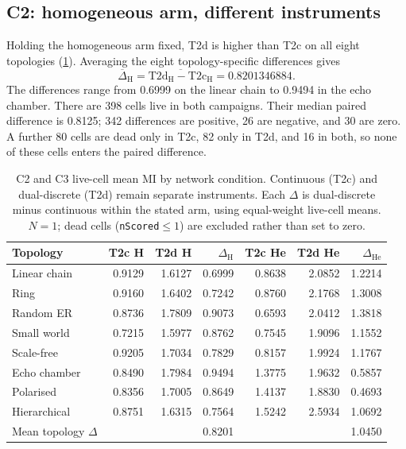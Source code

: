 \subsection{C2: homogeneous arm, different instruments}
\label{subsec:c2-mpr}

Holding the homogeneous arm fixed, T2d is higher than T2c on all eight
topologies (\cref{tab:c2c3-mpr}).  Averaging the eight topology-specific
differences gives
\[
  \overline{\Delta}_{\mathrm{H}}
  = \overline{\mathrm{T2d_H}-\mathrm{T2c_H}}
  = 0.8201346884 .
\]
The differences range from 0.6999 on the linear chain to 0.9494 in the
echo chamber.  There are 398 cells live in both campaigns.  Their median
paired difference is 0.8125; 342 differences are positive, 26 are negative,
and 30 are zero.  A further 80 cells are dead only in T2c, 82 only in T2d,
and 16 in both, so none of these cells enters the paired difference.

\begin{table}[t]
\centering
\caption{C2 and C3 live-cell mean MI by network condition. Continuous (T2c) and
dual-discrete (T2d) remain separate instruments. Each \(\Delta\) is dual-discrete
minus continuous within the stated arm, using equal-weight live-cell means.
\(N=1\); dead cells (\texttt{nScored}$\leq 1$) are excluded rather than set to zero.}
\label{tab:c2c3-mpr}
\small
\begin{tabular}{lrrrrrr}
\toprule
Topology
  & T2c H & T2d H & $\Delta_{\mathrm{H}}$
  & T2c He & T2d He & $\Delta_{\mathrm{He}}$ \\
\midrule
Linear chain & 0.9129 & 1.6127 & 0.6999 & 0.8638 & 2.0852 & 1.2214 \\
Ring         & 0.9160 & 1.6402 & 0.7242 & 0.8760 & 2.1768 & 1.3008 \\
Random ER    & 0.8736 & 1.7809 & 0.9073 & 0.6593 & 2.0412 & 1.3818 \\
Small world  & 0.7215 & 1.5977 & 0.8762 & 0.7545 & 1.9096 & 1.1552 \\
Scale-free   & 0.9205 & 1.7034 & 0.7829 & 0.8157 & 1.9924 & 1.1767 \\
Echo chamber & 0.8490 & 1.7984 & 0.9494 & 1.3775 & 1.9632 & 0.5857 \\
Polarised    & 0.8356 & 1.7005 & 0.8649 & 1.4137 & 1.8830 & 0.4693 \\
Hierarchical & 0.8751 & 1.6315 & 0.7564 & 1.5242 & 2.5934 & 1.0692 \\
\midrule
Mean topology $\Delta$
  & \multicolumn{2}{r}{} & 0.8201
  & \multicolumn{2}{r}{} & 1.0450 \\
\bottomrule
\end{tabular}
\end{table}

